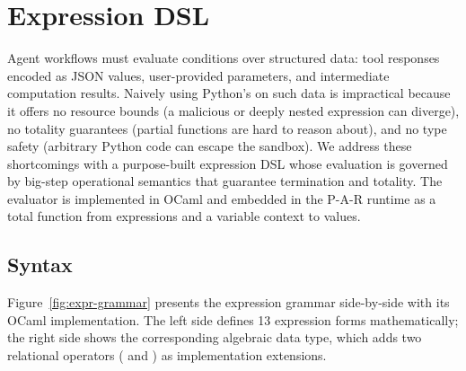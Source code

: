 \section{Expression DSL}\label{sec:expr-dsl}

Agent workflows must evaluate conditions over structured data: tool responses
encoded as JSON values, user-provided parameters, and intermediate computation
results. Naively using Python's  on such data is
impractical because it offers no resource bounds (a malicious or deeply nested
expression can diverge), no totality guarantees (partial functions are hard to
reason about), and no type safety (arbitrary Python code can escape the sandbox).
We address these shortcomings with a purpose-built expression DSL whose
evaluation is governed by big-step operational semantics that guarantee
termination and totality. The evaluator is implemented in OCaml and embedded in
the P-A-R runtime as a total function from expressions and a variable context to
values.

\subsection{Syntax}\label{sec:expr-syntax}

Figure~\ref{fig:expr-grammar} presents the expression grammar side-by-side with
its OCaml implementation. The left side defines 13 expression forms
mathematically; the right side shows the corresponding algebraic data type, which
adds two relational operators ( and
) as implementation extensions.

